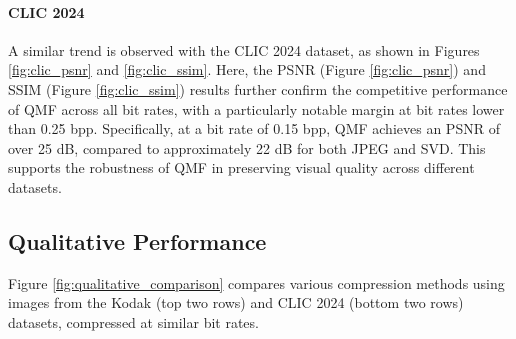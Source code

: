 \paragraph{CLIC 2024}
A similar trend is observed with the CLIC 2024 dataset, as shown in Figures \ref{fig:clic_psnr} and \ref{fig:clic_ssim}. Here, the PSNR (Figure \ref{fig:clic_psnr}) and SSIM (Figure \ref{fig:clic_ssim}) results further confirm the competitive performance of QMF across all bit rates, with a particularly notable margin at bit rates lower than 0.25 bpp. Specifically, at a bit rate of 0.15 bpp, QMF achieves an PSNR of over 25 dB, compared to approximately 22 dB for both JPEG and SVD. This supports the robustness of QMF in preserving visual quality across different datasets.

\subsection{Qualitative Performance}

Figure \ref{fig:qualitative_comparison} compares various compression methods using images from the Kodak (top two rows) and CLIC 2024 (bottom two rows) datasets, compressed at similar bit rates.

